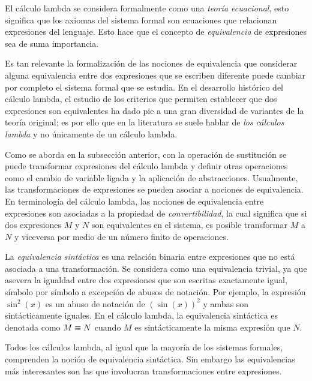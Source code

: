 El cálculo lambda se considera formalmente como una \emph{teoría ecuacional}, esto significa que los axiomas del sistema formal son ecuaciones que relacionan expresiones del lenguaje. Esto hace que el concepto de \emph{equivalencia} de expresiones sea de suma importancia.

Es tan relevante la formalización de las nociones de equivalencia que considerar alguna equivalencia entre dos expresiones que se escriben diferente puede cambiar por completo el sistema formal que se estudia. En el desarrollo histórico del cálculo lambda, el estudio de los criterios que permiten establecer que dos expresiones son equivalentes ha dado pie a una gran diversidad de variantes de la teoría original; es por ello que en la literatura se suele hablar de \emph{los cálculos lambda} y no únicamente de un cálculo lambda.

Como se aborda en la subsección anterior, con la operación de sustitución se puede transformar expresiones del cálculo lambda y definir otras operaciones como el cambio de variable ligada y la aplicación de abstracciones. Usualmente, las transformaciones de expresiones se pueden asociar a nociones de equivalencia. En terminología del cálculo lambda, las nociones de equivalencia entre expresiones son asociadas a la propiedad de \emph{convertibilidad}, la cual significa que si dos expresiones \( M \) y \( N \) son equivalentes en el sistema, es posible transformar \( M \) a \( N \) y viceversa por medio de un número finito de operaciones.

La \emph{equivalencia sintáctica} es una relación binaria entre expresiones que no está asociada a una transformación. Se considera como una equivalencia trivial, ya que asevera la igualdad entre dos expresiones que son escritas exactamente igual, símbolo por símbolo a excepción de abusos de notación. Por ejemplo, la expresión \( \sin^{2}(x) \) es un abuso de notación de \( \left( \sin(x) \right)^{2} \) y ambas son sintácticamente iguales.  En el cálculo lambda, la equivalencia sintáctica es denotada como \( M \equiv N \) cuando \( M \) es sintácticamente la misma expresión que \( N \).

Todos los cálculos lambda, al igual que la mayoría de los sistemas formales, comprenden la noción de equivalencia sintáctica. Sin embargo las equivalencias más interesantes son las que involucran transformaciones entre expresiones.

